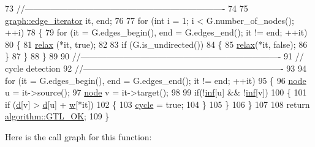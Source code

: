 \begin{DoxyCode}
73     \textcolor{comment}{//----------------------------------------------------------------------}
74 
75     \mbox{\hyperlink{classgraph_a818d3766018eb0af91d520ce2150203c}{graph::edge\_iterator}} it, end;
76 
77     \textcolor{keywordflow}{for} (\textcolor{keywordtype}{int} i = 1; i < G.number\_of\_nodes(); ++i)
78     \{   
79     \textcolor{keywordflow}{for} (it = G.edges\_begin(), end = G.edges\_end(); it != end; ++it)
80     \{
81             \mbox{\hyperlink{classbellman__ford_a7beb9204dc5bc65ed880a044a5aad81b}{relax}} (*it, \textcolor{keyword}{true});
82 
83             \textcolor{keywordflow}{if} (G.is\_undirected())
84             \{
85                 \mbox{\hyperlink{classbellman__ford_a7beb9204dc5bc65ed880a044a5aad81b}{relax}}(*it, \textcolor{keyword}{false});
86             \}
87     \}
88     \}
89 
90     \textcolor{comment}{//----------------------------------------------------------------------}
91     \textcolor{comment}{//   cycle detection}
92     \textcolor{comment}{//----------------------------------------------------------------------    }
93 
94     \textcolor{keywordflow}{for} (it = G.edges\_begin(), end = G.edges\_end(); it != end; ++it)
95     \{
96     \mbox{\hyperlink{classnode}{node}} u = it->source();
97     \mbox{\hyperlink{classnode}{node}} v = it->target();
98 
99     \textcolor{keywordflow}{if}(!\mbox{\hyperlink{classbellman__ford_a5c69a3ac59077a7a7e4b0484e5f85a32}{inf}}[u] && !\mbox{\hyperlink{classbellman__ford_a5c69a3ac59077a7a7e4b0484e5f85a32}{inf}}[v]) 
100     \{
101         \textcolor{keywordflow}{if} (\mbox{\hyperlink{classbellman__ford_a0e3b99854a3f998f8ef6cde6fb902040}{d}}[v] > \mbox{\hyperlink{classbellman__ford_a0e3b99854a3f998f8ef6cde6fb902040}{d}}[u] + \mbox{\hyperlink{classbellman__ford_ae05c9a40c2257f1e1f333b6a4f6fa656}{w}}[*it]) 
102         \{
103         \mbox{\hyperlink{classbellman__ford_aa2168afff14546b2fd99d2b52681156b}{cycle}} = \textcolor{keyword}{true};
104         \}
105     \}
106     \}
107 
108     \textcolor{keywordflow}{return} \mbox{\hyperlink{classalgorithm_af1a0078e153aa99c24f9bdf0d97f6710a5114c20e4a96a76b5de9f28bf15e282b}{algorithm::GTL\_OK}};
109 \}
\end{DoxyCode}
Here is the call graph for this function\+:\nopagebreak
